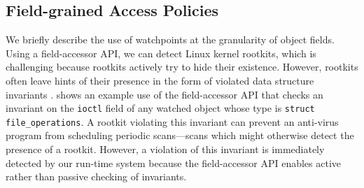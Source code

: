 \documentclass[letterpaper,twocolumn,10pt]{article}
\begin{document}






\subsection{Field-grained Access Policies\label{sec:access_policies}}

We briefly describe the use of watchpoints at the granularity of object fields. Using a field-accessor API, we can detect Linux kernel rootkits, which is challenging because rootkits actively try to hide their existence. However, rootkits often leave hints of their presence in the form of violated data structure invariants \cite{GibraltarKernelInvariants,OSck}. 
 shows an example use of the field-accessor API that checks an invariant on the \texttt{ioctl} field of any watched object whose type is \texttt{struct file\_operations}. A rootkit violating this invariant can prevent an anti-virus program from scheduling periodic scans---scans which might otherwise detect the presence of a rootkit. However, a violation of this invariant is immediately detected by our run-time system because the field-accessor API enables active rather than passive checking of invariants.
\end{document}
